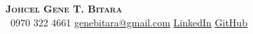 \begin{center}
    \textbf{\Huge \scshape Johcel Gene T. Bitara} \\ \vspace{1pt}
     \ \small 0970 322 4661 \quad
    \href{mailto:genebitara@gmail.com}{ \underline{genebitara@gmail.com}} \quad
    \href{https://www.linkedin.com/in/johcel-gene-bitara-a413b9283}{ \underline{LinkedIn}} \quad
    \href{https://github.com/genebit}{ \underline{GitHub}}
\end{center}
